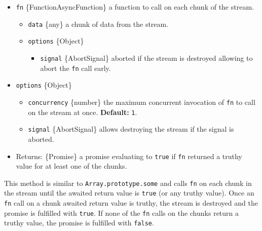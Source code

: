 \begin{itemize}
\tightlist
\item
  \texttt{fn} \{Function\textbar AsyncFunction\} a function to call on
  each chunk of the stream.

  \begin{itemize}
  \tightlist
  \item
    \texttt{data} \{any\} a chunk of data from the stream.
  \item
    \texttt{options} \{Object\}

    \begin{itemize}
    \tightlist
    \item
      \texttt{signal} \{AbortSignal\} aborted if the stream is destroyed
      allowing to abort the \texttt{fn} call early.
    \end{itemize}
  \end{itemize}
\item
  \texttt{options} \{Object\}

  \begin{itemize}
  \tightlist
  \item
    \texttt{concurrency} \{number\} the maximum concurrent invocation of
    \texttt{fn} to call on the stream at once. \textbf{Default:}
    \texttt{1}.
  \item
    \texttt{signal} \{AbortSignal\} allows destroying the stream if the
    signal is aborted.
  \end{itemize}
\item
  Returns: \{Promise\} a promise evaluating to \texttt{true} if
  \texttt{fn} returned a truthy value for at least one of the chunks.
\end{itemize}

This method is similar to \texttt{Array.prototype.some} and calls
\texttt{fn} on each chunk in the stream until the awaited return value
is \texttt{true} (or any truthy value). Once an \texttt{fn} call on a
chunk awaited return value is truthy, the stream is destroyed and the
promise is fulfilled with \texttt{true}. If none of the \texttt{fn}
calls on the chunks return a truthy value, the promise is fulfilled with
\texttt{false}.

